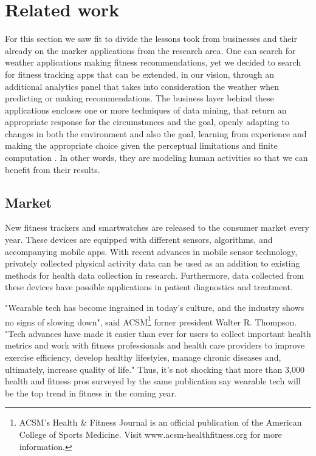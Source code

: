 \chapter{Related work}
\pagestyle{fancy}
\label{relatedwork}

For this section we saw fit to divide the lessons took from businesses and their already on the marker applications from the research area. One can search for weather applications making fitness recommendations, yet we decided to search for fitness tracking apps that can be extended, in our vision, through an additional analytics panel that takes into consideration the weather when predicting or making recommendations. The business layer behind these applications encloses one or more techniques of data mining, that return an appropriate response for the circumstances and the goal, openly adapting to changes in both the environment and also the goal, learning from experience and making the appropriate choice given the perceptual limitations and finite computation \cite{10.5555/1809744}. In other words, they are modeling human activities so that we can benefit from their results.

\section{Market}

New fitness trackers and smartwatches are released to the consumer market every year. These devices are equipped with different sensors, algorithms, and accompanying mobile apps. With recent advances in mobile sensor technology, privately collected physical activity data can be used as an addition to existing methods for health data collection in research. Furthermore, data collected from these devices have possible applications in patient diagnostics and treatment. \cite{info:doi/10.2196/jmir.9157}

"Wearable tech has become ingrained in today's culture, and the industry shows no signs of slowing down", said ACSM\footnote{ACSM's Health \& Fitness Journal is an official publication of the American College of Sports Medicine. Visit www.acsm-healthfitness.org for more information.} forner president Walter R. Thompson. "Tech advances have made it easier than ever for users to collect important health metrics and work with fitness professionals and health care providers to improve exercise efficiency, develop healthy lifestyles, manage chronic diseases and, ultimately, increase quality of life." Thus, it's not shocking that more than 3,000 health and fitness pros surveyed by the same publication say wearable tech will be the top trend in fitness in the coming year. \cite{WearableTrend2020}

